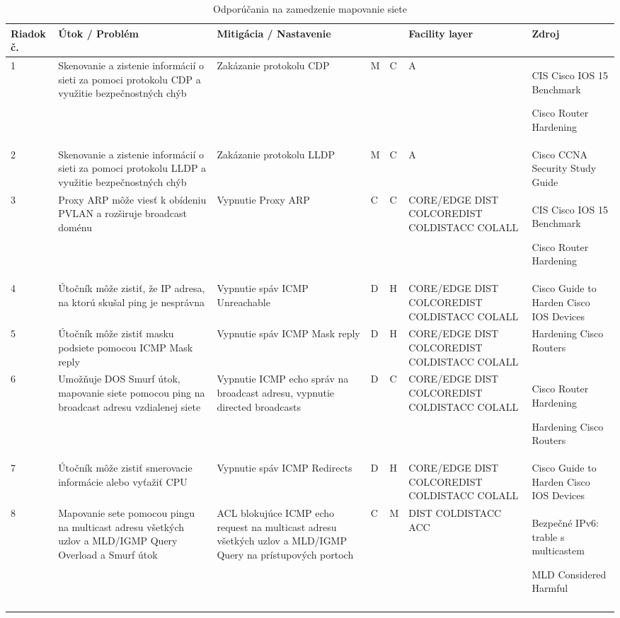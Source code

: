 \begin{longtable}[!htbp]{|C{2.5em}L{9em}L{9em}C{2em}C{2.5em}C{7.5em}L{10em}|}
	
	\hline
	\centering
	
	Riadok č.	&Útok / Problém	&Mitigácia / Nastavenie	& 	&	&Facility layer	&Zdroj\\
	\endhead
	
	 1	&Skenovanie a zistenie informácií o sieti za pomoci protokolu CDP a využitie bezpečnostných chýb	&Zakázanie protokolu CDP	&M	&C	&A	&CIS Cisco IOS 15 Benchmark \cite{CIS_DrTLsgXv24lxeIIM}
	
	Cisco Router Hardening \cite{Graesser2001}\\
	2	&Skenovanie a zistenie informácií o sieti za pomoci protokolu LLDP a využitie bezpečnostných chýb	&Zakázanie protokolu LLDP	&M	&C	&A	&Cisco CCNA Security Study Guide \cite{McMillan2018}\\
	 3	&Proxy ARP môže viesť k obídeniu PVLAN a rozširuje broadcast doménu	&Vypnutie Proxy ARP	&C	&C	&CORE/EDGE
	DIST
	COLCOREDIST
	COLDISTACC
	COLALL	&CIS Cisco IOS 15 Benchmark \cite{CIS_DrTLsgXv24lxeIIM}
	
	Cisco Router Hardening \cite{Graesser2001}\\
	4	&Útočník môže zistiť, že IP adresa, na ktorú skušal ping je nesprávna	&Vypnutie spáv ICMP Unreachable	&D	&H	&CORE/EDGE
	DIST
	COLCOREDIST
	COLDISTACC
	COLALL	&Cisco Guide to Harden Cisco IOS Devices \cite{Singh2018}
	\\
	 5	&Útočník môže zistiť masku podsiete pomocou ICMP Mask reply	&Vypnutie spáv ICMP Mask reply	&D	&H	&CORE/EDGE
	DIST
	COLCOREDIST
	COLDISTACC
	COLALL	&Hardening Cisco Routers \cite{Akin2002}
	\\
	6	&Umožňuje DOS Smurf útok, mapovanie siete pomocou ping na broadcast adresu vzdialenej siete	&Vypnutie ICMP echo správ na broadcast adresu, vypnutie directed broadcasts	&D	&C	&CORE/EDGE
	DIST
	COLCOREDIST
	COLDISTACC
	COLALL	&Cisco Router Hardening \cite{Graesser2001}
	
	Hardening Cisco Routers \cite{Akin2002}
	\\
	 7	&Útočník môže zistiť smerovacie informácie alebo vyťažiť CPU	&Vypnutie spáv ICMP Redirects	&D	&H	&CORE/EDGE
	DIST
	COLCOREDIST
	COLDISTACC
	COLALL	&Cisco Guide to Harden Cisco IOS Devices \cite{Singh2018}
	\\
	8	&Mapovanie sete pomocou pingu na multicast adresu všetkých uzlov a MLD/IGMP Query Overload a Smurf útok	& ACL blokujúce ICMP echo request na multicast adresu všetkých uzlov a MLD/IGMP Query na prístupových portoch	&C	&M	&DIST
	COLDISTACC
	ACC	&Bezpečné IPv6: trable s multicastem \cite{Podermanski532015}
	
	MLD Considered Harmful \cite{Rey2016}
	\\
	
	\hline
	\caption{Odporúčania na zamedzenie mapovanie siete}
	\label{tab:mapping}%
\end{longtable}%


